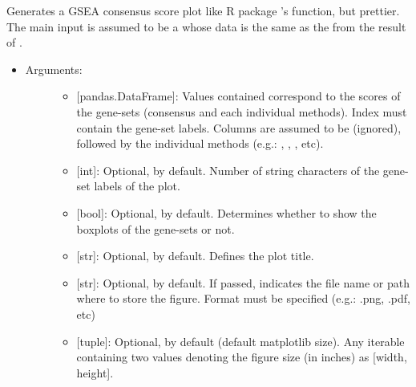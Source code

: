 \documentclass[letterpaper,10pt,english]{sphinxmanual}
\begin{document}
\begin{fulllineitems}
\label{\detokenize{plots:data_tools.plots.piano_consensus}}
Generates a GSEA consensus score plot like R package ’s
 function, but prettier.
The main input is assumed to be a  whose data
is the same as the  from the result of
.
\begin{itemize}
\item {} \begin{description}
\item[{Arguments:}] \leavevmode\begin{itemize}
\item {} 
 {[}pandas.DataFrame{]}: Values contained correspond to the
scores of the gene-sets (consensus and each individual
methods). Index must contain the gene-set labels. Columns are
assumed to be  (ignored),  followed
by the individual methods (e.g.: , ,
, etc).

\item {} 
 {[}int{]}: Optional,  by default. Number of string
characters of the gene-set labels of the plot.

\item {} 
 {[}bool{]}: Optional,  by default. Determines
whether to show the boxplots of the gene-sets or not.

\item {} 
 {[}str{]}: Optional,  by default. Defines the plot
title.

\item {} 
 {[}str{]}: Optional,  by default. If passed,
indicates the file name or path where to store the figure.
Format must be specified (e.g.: .png, .pdf, etc)

\item {} 
 {[}tuple{]}: Optional,  by default (default
matplotlib size). Any iterable containing two values denoting
the figure size (in inches) as {[}width, height{]}.


\end{itemize}
\end{description}
\end{itemize}
\end{fulllineitems}
\end{document}
